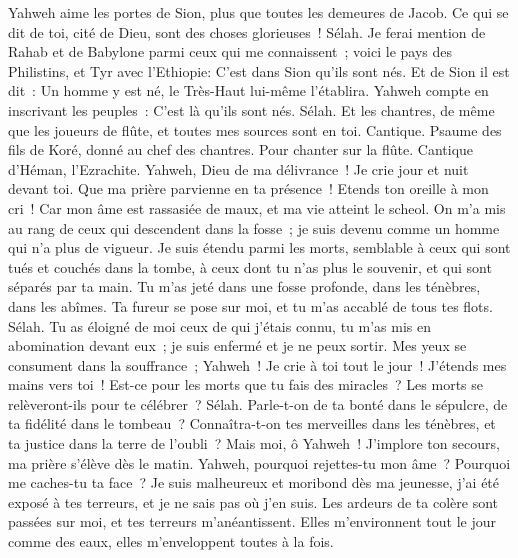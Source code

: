 \begin{multicols}{2}
Yahweh aime les portes de Sion, plus que toutes les demeures de Jacob.
Ce qui se dit de toi, cité de Dieu, sont des choses glorieuses~! Sélah.
Je ferai mention de Rahab et de Babylone parmi ceux qui me connaissent~; voici le pays des Philistins, et Tyr avec l'Ethiopie: C'est dans Sion qu'ils sont nés.
Et de Sion il est dit~: Un homme y est né, le Très-Haut lui-même l'établira.
Yahweh compte en inscrivant les peuples~: C'est là qu'ils sont nés. Sélah.
Et les chantres, de même que les joueurs de flûte, et toutes mes sources sont en toi.
\VerseOne{}Cantique. Psaume des fils de Koré, donné au chef des chantres. Pour chanter sur la flûte. Cantique d'Héman, l'Ezrachite.
Yahweh, Dieu de ma délivrance~! Je crie jour et nuit devant toi.
Que ma prière parvienne en ta présence~! Etends ton oreille à mon cri~!
Car mon âme est rassasiée de maux, et ma vie atteint le scheol.
On m'a mis au rang de ceux qui descendent dans la fosse~; je suis devenu comme un homme qui n'a plus de vigueur.
Je suis étendu parmi les morts, semblable à ceux qui sont tués et couchés dans la tombe, à ceux dont tu n'as plus le souvenir, et qui sont séparés par ta main.
Tu m'as jeté dans une fosse profonde, dans les ténèbres, dans les abîmes.
Ta fureur se pose sur moi, et tu m'as accablé de tous tes flots. Sélah.
Tu as éloigné de moi ceux de qui j'étais connu, tu m'as mis en abomination devant eux~; je suis enfermé et je ne peux sortir.
Mes yeux se consument dans la souffrance~; Yahweh~! Je crie à toi tout le jour~! J'étends mes mains vers toi~!
Est-ce pour les morts que tu fais des miracles~? Les morts se relèveront-ils pour te célébrer~? Sélah.
Parle-t-on de ta bonté dans le sépulcre, de ta fidélité dans le tombeau~?
Connaîtra-t-on tes merveilles dans les ténèbres, et ta justice dans la terre de l'oubli~?
Mais moi, ô Yahweh~! J'implore ton secours, ma prière s'élève dès le matin.
Yahweh, pourquoi rejettes-tu mon âme~? Pourquoi me caches-tu ta face~?
Je suis malheureux et moribond dès ma jeunesse, j'ai été exposé à tes terreurs, et je ne sais pas où j'en suis.
Les ardeurs de ta colère sont passées sur moi, et tes terreurs m'anéantissent.
Elles m'environnent tout le jour comme des eaux, elles m'enveloppent toutes à la fois.

\end{multicols}
